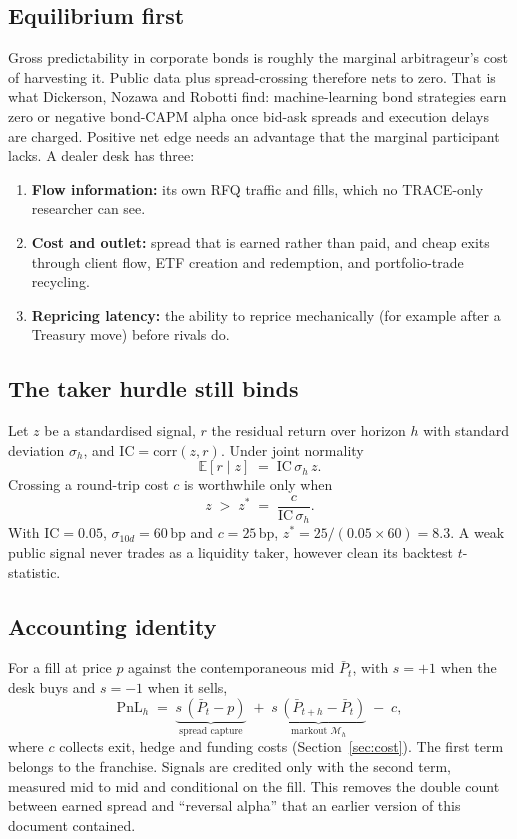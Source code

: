 \documentclass[11pt,letterpaper]{article}
\newcommand{\E}{\mathbb{E}}
\newcommand{\bp}{\,\mathrm{bp}}
\newcommand{\Pm}{\bar{P}}                 %
\begin{document}
\subsection{Equilibrium first}
Gross predictability in corporate bonds is roughly the marginal arbitrageur's cost of harvesting it. Public data plus spread-crossing therefore nets to zero. That is what Dickerson, Nozawa and Robotti \cite{dnr2024} find: machine-learning bond strategies earn zero or negative bond-CAPM alpha once bid-ask spreads and execution delays are charged. Positive net edge needs an advantage that the marginal participant lacks. A dealer desk has three:
\begin{enumerate}[itemsep=2pt,topsep=2pt]
\item \textbf{Flow information:} its own RFQ traffic and fills, which no TRACE-only researcher can see.
\item \textbf{Cost and outlet:} spread that is earned rather than paid, and cheap exits through client flow, ETF creation and redemption, and portfolio-trade recycling.
\item \textbf{Repricing latency:} the ability to reprice mechanically (for example after a Treasury move) before rivals do.
\end{enumerate}

\subsection{The taker hurdle still binds}
Let $z$ be a standardised signal, $r$ the residual return over horizon $h$ with standard deviation $\sigma_h$, and $\mathrm{IC}=\mathrm{corr}(z,r)$. Under joint normality
\begin{equation}
\E[r \mid z] \;=\; \mathrm{IC}\,\sigma_h\, z .
\end{equation}
Crossing a round-trip cost $c$ is worthwhile only when
\begin{equation}
z \;>\; z^{*} \;=\; \frac{c}{\mathrm{IC}\,\sigma_h}.
\label{eq:zstar}
\end{equation}
With $\mathrm{IC}=0.05$, $\sigma_{10d}=60\bp$ and $c=25\bp$, $z^{*}=25/(0.05\times 60)=8.3$. A weak public signal never trades as a liquidity taker, however clean its backtest $t$-statistic.

\subsection{Accounting identity}
For a fill at price $p$ against the contemporaneous mid $\Pm_t$, with $s=+1$ when the desk buys and $s=-1$ when it sells,
\begin{equation}
\mathrm{PnL}_h \;=\; \underbrace{s\,(\Pm_t - p)}_{\text{spread capture}} \;+\; \underbrace{s\,(\Pm_{t+h}-\Pm_t)}_{\text{markout } \mathcal{M}_h} \;-\; c ,
\label{eq:identity}
\end{equation}
where $c$ collects exit, hedge and funding costs (Section~\ref{sec:cost}). The first term belongs to the franchise. Signals are credited only with the second term, measured mid to mid and conditional on the fill. This removes the double count between earned spread and ``reversal alpha'' that an earlier version of this document contained.
\end{document}
